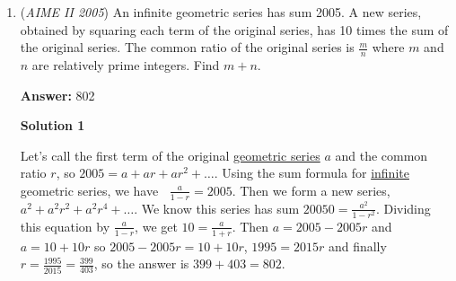 \begin{enumerate}
 xxx, yyy, zzz

 So you have to choose one x, one y, and one z to give to the first person. There are 3 xs, 3 ys, and 3 zs to select from, giving $3^3$ combinations. Multiply that by the combinations of xs, ys, and zs for the second person, which is evidently $2^3$ since there are two of each letter left. 

 $(27*8)/{9 \choose 3}{6 \choose3}$ simplifies down to our fraction m/n, which is $9/70$. Adding them up gives $9 + 70 = \boxed{79}$.

 



\textbf{Solution 4}

Let the objects be $A_1$, $A_2$, $A_3$ with similar labeling for $B$ and $C$. There are $9!$ ways to order these nine objects in a line.

 We then label three "zones" corresponding to the three people's meals as the first, second, and third objects in the line corresponding to the first zone, the fourth, fifth, and sixth to the second zone, and the remainder to the third zone. Each zone must contain one of each $A$, $B$, and $C$. There are $6$ ways to place the three $A$ rolls in three different zones, and the same goes for $B$ and $C$. In each zone, there are $6$ ways to order the three rolls, so there are in total $6^6$ legal orderings.

 Thus the desired probability is $\frac{6^6}{9!}=\frac{9}{70}$, so the answer is $9+70=\boxed{79}$.

 


	\item (\textit{AIME II 2005}) An infinite geometric series has sum 2005. A new series, obtained by squaring each term of the original series, has 10 times the sum of the original series. The common ratio of the original series is $\frac mn$ where $m$ and $n$ are relatively prime integers. Find $m+n.$

 \textbf{Answer: }802



\textbf{Solution 1}

Let's call the first term of the original \href{https://artofproblemsolving.com/wiki/index.php?title=Geometric\_series}{geometric series} $a$ and the common ratio $r$, so $2005 = a + ar + ar^2 + \ldots$.  Using the sum formula for \href{https://artofproblemsolving.com/wiki/index.php?title=Infinite}{infinite} geometric series, we have $\;\;\frac a{1 -r} = 2005$.  Then we form a new series, $a^2 + a^2 r^2 + a^2 r^4 + \ldots$.  We know this series has sum  $20050 = \frac{a^2}{1 - r^2}$.  Dividing this equation by $\frac{a}{1-r}$, we get $10 = \frac a{1 + r}$.  Then $a = 2005 - 2005r$ and $a = 10 + 10r$ so $2005 - 2005r = 10 + 10r$, $1995 = 2015r$ and finally $r = \frac{1995}{2015} = \frac{399}{403}$, so the answer is $399 + 403 = \boxed{802}$.  


\end{enumerate}
